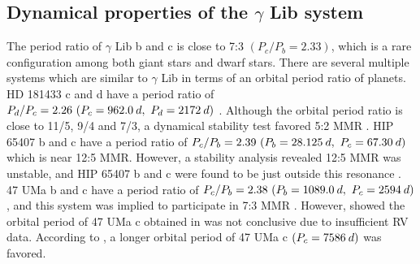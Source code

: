 \documentclass[]{pasj01}
\begin{document}
\subsection{Dynamical properties of the $\gamma$ Lib system}
The period ratio of $\gamma$ Lib b and c is close to 7:3 $(P_c/P_b = 2.33)$, which is a rare configuration among both giant stars and dwarf stars.
There are several multiple systems which are similar to $\gamma$ Lib in terms of an orbital period ratio of planets.
HD 181433 c and d have a period ratio of $P_d/P_c = 2.26\ (P_c=962.0\>{\rm d},\ P_d=2172\>{\rm d})$ \citep{Bouchy2009}.
Although the orbital period ratio is close to 11/5, 9/4 and 7/3, a dynamical stability test favored 5:2 MMR \citep{Campanella2011}.
HIP 65407 b and c have a period ratio of $P_c/P_b = 2.39\ (P_b=28.125\>{\rm d},\ P_c=67.30\>{\rm d})$ \citep{Hebrard2016} which is near 12:5 MMR.
However, a stability analysis revealed 12:5 MMR was unstable, and HIP 65407 b and c were found to be just outside this resonance \citep{Hebrard2016}.
47 UMa b and c have a period ratio of $P_c/P_b = 2.38\ (P_b=1089.0\>{\rm d},\ P_c=2594\>{\rm d})$ \citep{Fischer2002}, and this system was implied to participate in 7:3 MMR \citep{Laughlin2002}.
However, \citet{Wittenmyer2007} showed the orbital period of 47 UMa c obtained in \citet{Fischer2002} was not conclusive due to insufficient RV data.
According to \citet{Wittenmyer2007}, a longer orbital period of 47 UMa c $(P_c=7586\>{\rm d})$ was favored.
\end{document}
